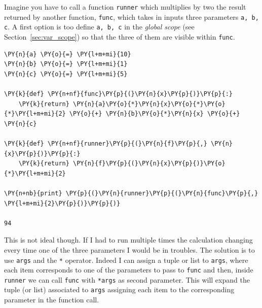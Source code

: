 Imagine you have to call a function \texttt{runner} which multiplies by two the result returned
by another function, \texttt{func}, which takes in inputs three parameters \texttt{a, b, c}.
A first option is too define \texttt{a, b, c} in the \emph{global scope} (see Section~\ref{sec:var_scope}) 
so that the three of them are visible within \texttt{func}.
\begin{codebox}[breakable, size=fbox, boxrule=1pt, pad at break*=1mm,colback=cellbackground, colframe=cellborder]
\begin{Verbatim}[commandchars=\\\{\}]
\PY{n}{a} \PY{o}{=} \PY{l+m+mi}{10}
\PY{n}{b} \PY{o}{=} \PY{l+m+mi}{1}
\PY{n}{c} \PY{o}{=} \PY{l+m+mi}{5}
 		
\PY{k}{def} \PY{n+nf}{func}\PY{p}{(}\PY{n}{x}\PY{p}{)}\PY{p}{:}
    \PY{k}{return} \PY{n}{a}\PY{o}{*}\PY{n}{x}\PY{o}{*}\PY{o}{*}\PY{l+m+mi}{2} \PY{o}{+} \PY{n}{b}\PY{o}{*}\PY{n}{x} \PY{o}{+} \PY{n}{c}
 		
\PY{k}{def} \PY{n+nf}{runner}\PY{p}{(}\PY{n}{f}\PY{p}{,} \PY{n}{x}\PY{p}{)}\PY{p}{:}
    \PY{k}{return} \PY{n}{f}\PY{p}{(}\PY{n}{x}\PY{p}{)}\PY{o}{*}\PY{l+m+mi}{2}
 		
\PY{n+nb}{print} \PY{p}{(}\PY{n}{runner}\PY{p}{(}\PY{n}{func}\PY{p}{,} \PY{l+m+mi}{2}\PY{p}{)}\PY{p}{)}
 	
94
\end{Verbatim}
\end{codebox}

This is not ideal though. If I had to run multiple times the calculation changing every time one 
of the three parameters I would be in troubles. 
The solution is to use \texttt{args} and the \texttt{*} operator. Indeed I can assign a 
tuple or list to \texttt{args}, where each item corresponds to one of the parameters to 
pass to \texttt{func} and then, inside \texttt{runner} we can call \texttt{func} with \texttt{*args} 
as second parameter. This will expand the tuple (or list) associated to \texttt{args} 
assigning each item to the corresponding parameter in the function call.

